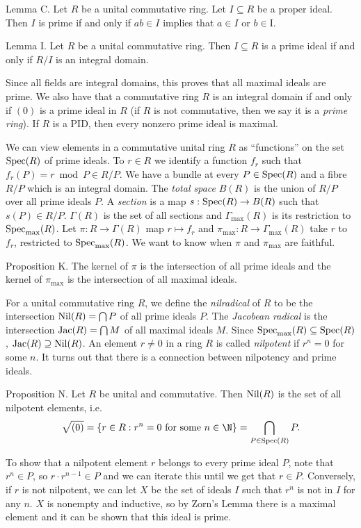 \proclaim Lemma C. Let $R$ be a unital commutative ring. Let $I\subseteq R$ be a proper ideal. Then $I$ is prime if and only if $ab\in I$ implies that $a\in I$ or $b\in $I.\slug

\proclaim Lemma I. Let $R$ be a unital commutative ring. Then $I\subseteq R$ is a prime ideal if and only if $R/I$ is an integral domain.\slug

Since all fields are integral domains, this proves that all maximal ideals are prime. We also have that a commutative ring $R$ is an integral domain if and only if $(0)$ is a prime ideal in $R$ (if $R$ is not commutative, then we say it is a {\it prime ring}). If $R$ is a PID, then every nonzero prime ideal is maximal.

We can view elements in a commutative unital ring $R$ as ``functions'' on the set $\mathop {\rm Spec}(R)$ of prime ideals. To $r\in R$ we identify a function $f_r$ such that $f_r(P) = r \bmod P\in R/P$. We have a bundle at every $P\in \mathop {\rm Spec}(R)$ and a fibre $R/P$ which is an integral domain. The {\it total space} $B(R)$ is the union of $R/P$ over all prime ideals $P$. A {\it section} is a map $s: \mathop {\rm Spec}(R)\to B(R)$ such that $s(P)\in R/P$. $\Gamma(R)$ is the set of all sections and $\Gamma_{\max}(R)$ is its restriction to $\mathop {\rm Spec}_{\max}(R)$. Let $\pi : R\to \Gamma(R)$ map $r\mapsto f_r$ and $\pi_{\max} : R\to \Gamma_{\max}(R)$ take $r$ to $f_r$, restricted to $\mathop {\rm Spec}_{\max}(R)$. We want to know when $\pi$ and $\pi_{\max}$ are faithful.

\proclaim Proposition K. The kernel of $\pi$ is the intersection of all prime ideals and the kernel of $\pi_{\max}$ is the intersection of all maximal ideals.\slug

For a unital commutative ring $R$, we define the {\it nilradical} of $R$ to be the intersection $\mathop {\rm Nil}(R) = \bigcap P$ of all prime ideals $P$. The {\it Jacobean radical} is the intersection $\mathop {\rm Jac}(R) = \bigcap M$ of all maximal ideals $M$. Since $\mathop {\rm Spec}_{\max}(R) \subseteq \mathop {\rm Spec}(R)$, $\mathop {\rm Jac}(R) \supseteq \mathop {\rm Nil}(R)$. An element $r\neq 0$ in a ring $R$ is called {\it nilpotent} if $r^n = 0$ for some $n$. It turns out that there is a connection between nilpotency and prime ideals.

\proclaim Proposition N. Let $R$ be unital and commutative. Then $\mathop {\rm Nil}(R)$ is the set of all nilpotent elements, i.e.
$$\sqrt{(0)} = \{r\in R : r^n = 0\ \hbox{for some}\ n\in \N\} = \bigcap_{P\in \Spec(R)} P.$$

\proof To show that a nilpotent element $r$ belongs to every prime ideal $P$, note that $r^n \in P$, so $r\cdot r^{n-1}\in P$ and we can iterate this until we get that $r\in P$. Conversely, if $r$ is not nilpotent, we can let $X$ be the set of ideals $I$ such that $r^n$ is not in $I$ for any $n$. $X$ is nonempty and inductive, so by Zorn's Lemma there is a maximal element and it can be shown that this ideal is prime.\slug

